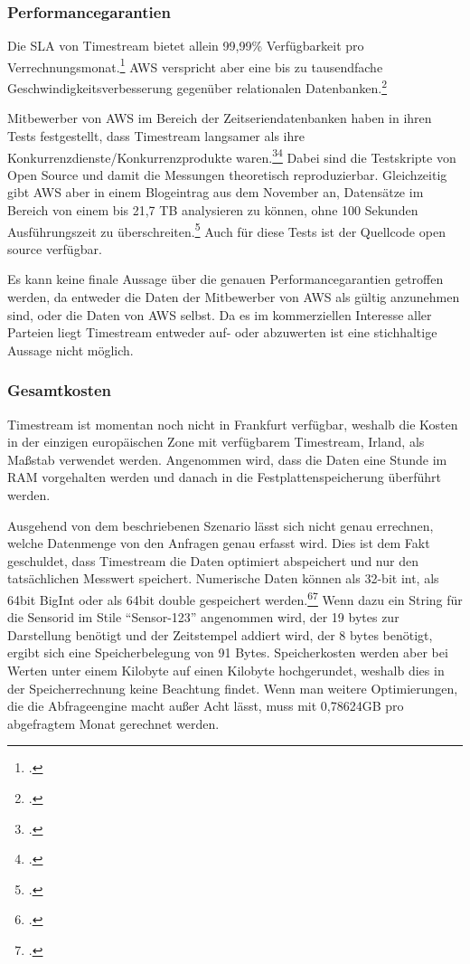 \subsubsection{Performancegarantien}
Die \ac{SLA} von Timestream bietet allein 99,99\% Verfügbarkeit pro Verrechnungsmonat.\footcite[Vgl.][]{AmazonWebServicesInc..2020d} \ac{AWS} verspricht aber eine bis zu tausendfache Geschwindigkeitsverbesserung gegenüber relationalen Datenbanken.\footcite[Vgl.][]{AmazonWebServicesInc..o.J.ak}

Mitbewerber von \ac{AWS} im Bereich der Zeitseriendatenbanken haben in ihren Tests festgestellt, dass Timestream langsamer als ihre Konkurrenzdienste/Konkurrenzprodukte waren.\footcite[Vgl.][]{Booz.2020}\nzitat\footcite[Vgl.][]{Crate.ioInc..2020} Dabei sind die Testskripte von \citeauthor{Booz.2020} Open Source und damit die Messungen theoretisch reproduzierbar. Gleichzeitig gibt \ac{AWS} aber in einem Blogeintrag aus dem November an, Datensätze im Bereich von einem bis 21,7 TB analysieren zu können, ohne 100 Sekunden Ausführungszeit zu überschreiten.\footcite[Vgl.][]{Das.2020} Auch für diese Tests ist der Quellcode open source verfügbar.

Es kann keine finale Aussage über die genauen Performancegarantien getroffen werden, da entweder die Daten der Mitbewerber von \ac{AWS} als gültig anzunehmen sind, oder die Daten von \ac{AWS} selbst. Da es im kommerziellen Interesse aller Parteien liegt Timestream entweder auf- oder abzuwerten ist eine stichhaltige Aussage nicht möglich.

\subsubsection{Gesamtkosten}


Timestream ist momentan noch nicht in Frankfurt verfügbar, weshalb die Kosten in der einzigen europäischen Zone mit verfügbarem Timestream, Irland, als Maßstab verwendet werden. Angenommen wird, dass die Daten eine Stunde im \ac{RAM} vorgehalten werden und danach in die Festplattenspeicherung überführt werden.


Ausgehend von dem beschriebenen Szenario lässt sich nicht genau errechnen, welche Datenmenge von den Anfragen genau erfasst wird. Dies ist dem Fakt geschuldet, dass Timestream die Daten optimiert abspeichert und nur den tatsächlichen Messwert speichert. Numerische Daten können als 32-bit int, als 64bit BigInt oder als 64bit double gespeichert werden.\footcite[Vgl. auch im Folgenden][]{AmazonWebServicesInc..o.J.r}\nzitat\footcite[Vgl. auch im Folgenden][]{AmazonWebServicesInc..o.J.q} Wenn dazu ein String für die Sensorid im Stile \enquote{Sensor-123} angenommen wird, der 19 bytes zur Darstellung benötigt und der Zeitstempel addiert wird, der 8 bytes benötigt, ergibt sich eine Speicherbelegung von 91 Bytes. Speicherkosten werden aber bei Werten unter einem Kilobyte auf einen Kilobyte hochgerundet, weshalb dies in der Speicherrechnung keine Beachtung findet. Wenn man weitere Optimierungen, die die Abfrageengine macht außer Acht lässt, muss mit 0,78624GB pro abgefragtem Monat gerechnet werden.


